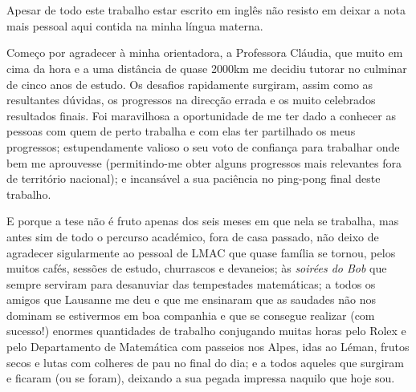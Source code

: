 
\section*{\acknowledgments}


Apesar de todo este trabalho estar escrito em inglês não resisto em deixar a nota mais pessoal aqui contida na minha língua materna.

Começo por agradecer à minha orientadora, a Professora Cláudia,  que muito em cima da hora e a uma distância de quase 2000km me decidiu tutorar no culminar de cinco anos de estudo. 
Os desafios rapidamente surgiram, assim como as resultantes dúvidas, os progressos na direcção errada e os muito celebrados resultados finais. 
Foi maravilhosa a oportunidade de me ter dado a conhecer as pessoas com quem de perto trabalha e com elas ter partilhado os meus progressos; estupendamente valioso o seu voto de confiança para trabalhar onde bem me aprouvesse (permitindo-me obter alguns progressos mais relevantes fora de território nacional); e incansável a sua paciência no ping-pong final deste trabalho.

E porque a tese não é fruto apenas dos seis meses em que nela se trabalha, mas antes sim de todo o percurso académico, fora de casa passado, não deixo de agradecer sigularmente ao pessoal de LMAC que quase família se tornou, pelos muitos cafés, sessões de estudo, churrascos e devaneios; às \textit{soirées do Bob} que sempre serviram para desanuviar das tempestades matemáticas; a todos os amigos que Lausanne me deu e que me ensinaram que as saudades não nos dominam se estivermos em boa companhia e que se consegue realizar (com sucesso!) enormes quantidades de trabalho conjugando muitas horas pelo Rolex e pelo Departamento de Matemática com passeios nos Alpes, idas ao Léman, frutos secos e lutas com colheres de pau no final do dia; e a todos aqueles que surgiram e ficaram (ou se foram), deixando a sua pegada impressa naquilo que hoje sou.


